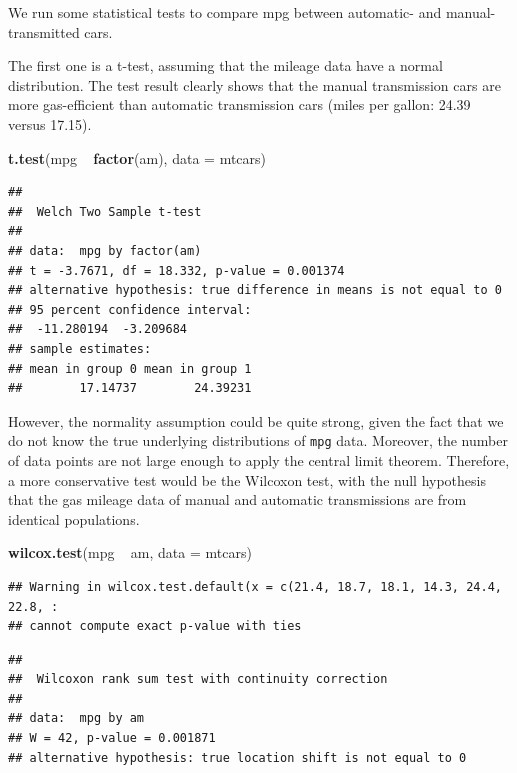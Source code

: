 \documentclass[]{article}
\newenvironment{Shaded}{\begin{snugshade}}{\end{snugshade}}
\newcommand{\KeywordTok}[1]{\textcolor[rgb]{0.13,0.29,0.53}{\textbf{{#1}}}}
\newcommand{\DataTypeTok}[1]{\textcolor[rgb]{0.13,0.29,0.53}{{#1}}}
\newcommand{\StringTok}[1]{\textcolor[rgb]{0.31,0.60,0.02}{{#1}}}
\newcommand{\NormalTok}[1]{{#1}}
\numberwithin{equation}{section}
\begin{document}
We run some statistical tests to compare mpg between automatic- and
manual-transmitted cars.

The first one is a t-test, assuming that the mileage data have a normal
distribution. The test result clearly shows that the manual transmission
cars are more gas-efficient than automatic transmission cars (miles per
gallon: 24.39 versus 17.15).

\begin{Shaded}
\begin{Highlighting}[]
\KeywordTok{t.test}\NormalTok{(mpg ~}\StringTok{ }\KeywordTok{factor}\NormalTok{(am), }\DataTypeTok{data =} \NormalTok{mtcars)}
\end{Highlighting}
\end{Shaded}

\begin{verbatim}
## 
##  Welch Two Sample t-test
## 
## data:  mpg by factor(am)
## t = -3.7671, df = 18.332, p-value = 0.001374
## alternative hypothesis: true difference in means is not equal to 0
## 95 percent confidence interval:
##  -11.280194  -3.209684
## sample estimates:
## mean in group 0 mean in group 1 
##        17.14737        24.39231
\end{verbatim}

However, the normality assumption could be quite strong, given the fact
that we do not know the true underlying distributions of \texttt{mpg}
data. Moreover, the number of data points are not large enough to apply
the central limit theorem. Therefore, a more conservative test would be
the Wilcoxon test, with the null hypothesis that the gas mileage data of
manual and automatic transmissions are from identical populations.

\begin{Shaded}
\begin{Highlighting}[]
\KeywordTok{wilcox.test}\NormalTok{(mpg ~}\StringTok{ }\NormalTok{am, }\DataTypeTok{data =} \NormalTok{mtcars)}
\end{Highlighting}
\end{Shaded}

\begin{verbatim}
## Warning in wilcox.test.default(x = c(21.4, 18.7, 18.1, 14.3, 24.4, 22.8, :
## cannot compute exact p-value with ties
\end{verbatim}

\begin{verbatim}
## 
##  Wilcoxon rank sum test with continuity correction
## 
## data:  mpg by am
## W = 42, p-value = 0.001871
## alternative hypothesis: true location shift is not equal to 0
\end{verbatim}
\end{document}
